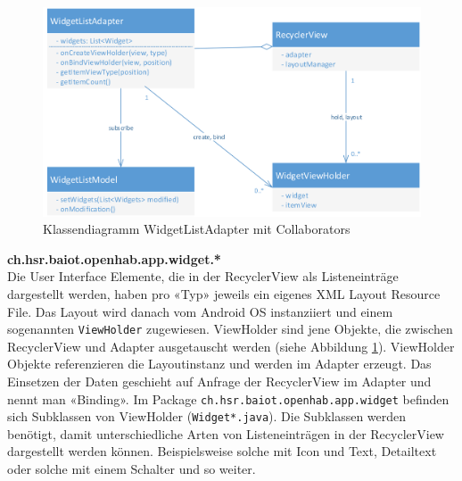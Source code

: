 \begin{figure}[H]
	\centering
		\includegraphics[width=\textwidth]{report/img/recycler_view.png}
	\caption{Klassendiagramm WidgetListAdapter mit Collaborators}
	\label{fig:recylerViewClasses}
\end{figure}

\textbf{ch.hsr.baiot.openhab.app.widget.*}\\
Die User Interface Elemente, die in der RecyclerView als Listeneinträge dargestellt werden, haben pro «Typ» jeweils ein eigenes XML Layout Resource File. Das Layout wird danach vom Android OS instanziiert und einem sogenannten \lstinline!ViewHolder! zugewiesen. ViewHolder sind jene Objekte, die zwischen RecyclerView und Adapter ausgetauscht werden (siehe Abbildung \ref{fig:recylerViewClasses}). ViewHolder Objekte referenzieren die Layoutinstanz und werden im Adapter erzeugt. Das Einsetzen der Daten geschieht auf Anfrage der RecyclerView im Adapter und nennt man «Binding». Im Package \lstinline!ch.hsr.baiot.openhab.app.widget! befinden sich Subklassen von ViewHolder (\lstinline!Widget*.java!). Die Subklassen werden benötigt, damit unterschiedliche Arten von Listeneinträgen in der RecyclerView dargestellt werden können. Beispielsweise solche mit Icon und Text, Detailtext oder solche mit einem Schalter und so weiter. 

